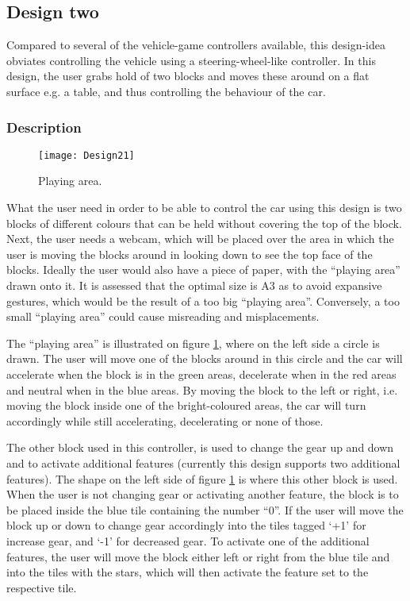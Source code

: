 \subsection{Design two}
Compared to several of the vehicle-game controllers available, this design-idea obviates controlling the vehicle using a steering-wheel-like controller. In this design, the user grabs hold of two blocks and moves these around on a flat surface e.g. a table, and thus controlling the behaviour of the car.

\subsubsection*{Description}

\begin{figure}[h]
\centering
\texttt{[image: Design21]}
\caption{Playing area.}
\label{fig:design21}
\end{figure}

What the user need in order to be able to control the car using this design is two blocks of different colours that can be held without covering the top of the block. Next, the user needs a webcam, which will be placed over the area in which the user is moving the blocks around in looking down to see the top face of the blocks. Ideally the user would also have a piece of paper, with the “playing area” drawn onto it. It is assessed that the optimal size is A3 as to avoid expansive gestures, which would be the result of a too big “playing area”. Conversely, a too small “playing area” could cause misreading and misplacements.
\bigskip

The “playing area” is illustrated on figure \ref{fig:design21}, where on the left side a circle is drawn. The user will move one of the blocks around in this circle and the car will accelerate when the block is in the green areas, decelerate when in the red areas and neutral when in the blue areas. By moving the block to the left or right, i.e. moving the block inside one of the bright-coloured areas, the car will turn accordingly while still accelerating, decelerating or none of those.

The other block used in this controller, is used to change the gear up and down and to activate additional features (currently this design supports two additional features). The shape on the left side of figure \ref{fig:design21} is where this other block is used. When the user is not changing gear or activating another feature, the block is to be placed inside the blue tile containing the number “0”. If the user will move the block up or down to change gear accordingly into the tiles tagged ‘+1’ for increase gear, and ‘-1’ for decreased gear. To activate one of the additional features, the user will move the block either left or right from the blue tile and into the tiles with the stars, which will then activate the feature set to the respective tile.

